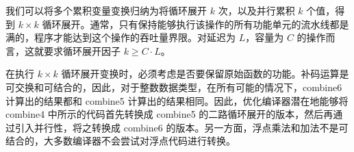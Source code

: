 我们可以将多个累积变量变换归纳为将循环展开 $k$ 次，以及并行累积 $k$ 个值，得到 $k \times k$ 循环展开。通常，只有保持能够执行该操作的所有功能单元的流水线都是满的，程序才能达到这个操作的吞吐量界限。对延迟为 $L$，容量为 $C$ 的操作而言，这就要求循环展开因子 $k \geq C \cdot L$。

在执行 $k \times k$ 循环展开变换时，必须考虑是否要保留原始函数的功能。补码运算是可交换和可结合的，因此，对于整数数据类型，在所有可能的情况下，combine6 计算出的结果都和 combine5 计算出的结果相同。因此，优化编译器潜在地能够将 combine4 中所示的代码首先转换成 combine5 的二路循环展开的版本，然后再通过引入并行性，将之转换成 combine6 的版本。另一方面，浮点乘法和加法不是可结合的，大多数编译器不会尝试对浮点代码进行转换。
